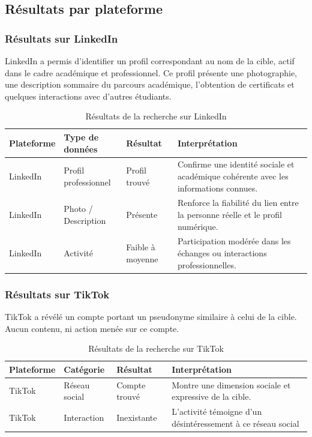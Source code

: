\documentclass[memoire,12pt]{report}
\begin{document}
\subsection{Résultats par plateforme}

\subsubsection{Résultats sur LinkedIn}

LinkedIn a permis d’identifier un profil correspondant au nom de la cible, actif dans le cadre académique et professionnel.  
Ce profil présente une photographie, une description sommaire du parcours académique, l'obtention de certificats et quelques interactions avec d’autres étudiants.

\begin{table}[H]
\centering
\caption{Résultats de la recherche sur LinkedIn}
\begin{tabular}{|p{3cm}|p{3cm}|p{3cm}|p{4cm}|}
\hline
\textbf{Plateforme} & \textbf{Type de données} & \textbf{Résultat} & \textbf{Interprétation} \\
\hline
LinkedIn & Profil professionnel & Profil trouvé & Confirme une identité sociale et académique cohérente avec les informations connues. \\
\hline
LinkedIn & Photo / Description & Présente & Renforce la fiabilité du lien entre la personne réelle et le profil numérique. \\
\hline
LinkedIn & Activité & Faible à moyenne & Participation modérée dans les échanges ou interactions professionnelles. \\
\hline
\end{tabular}
\end{table}

\subsubsection{Résultats sur TikTok}

TikTok a révélé un compte portant un pseudonyme similaire à celui de la cible. Aucun contenu, ni action menée sur ce compte.

\begin{table}[H]
\centering
\caption{Résultats de la recherche sur TikTok}
\begin{tabular}{|p{3cm}|p{3cm}|p{3cm}|p{4cm}|}
\hline
\textbf{Plateforme} & \textbf{Catégorie} & \textbf{Résultat} & \textbf{Interprétation} \\
\hline
TikTok & Réseau social & Compte trouvé & Montre une dimension sociale et expressive de la cible. \\
\hline
TikTok & Interaction & Inexistante& L’activité témoigne d’un désintéressement à ce réseau social \\
\hline
\end{tabular}
\end{table}
\end{document}
